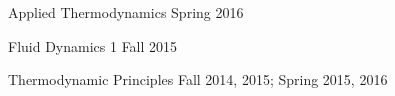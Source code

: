 
\vspace{0.25\baselineskip}

\begin{outerlist}
\item Applied Thermodynamics \hfill Spring 2016

\item Fluid Dynamics 1 \hfill Fall 2015

\item Thermodynamic Principles \hfill Fall 2014, 2015; Spring 2015, 2016


\end{outerlist}
